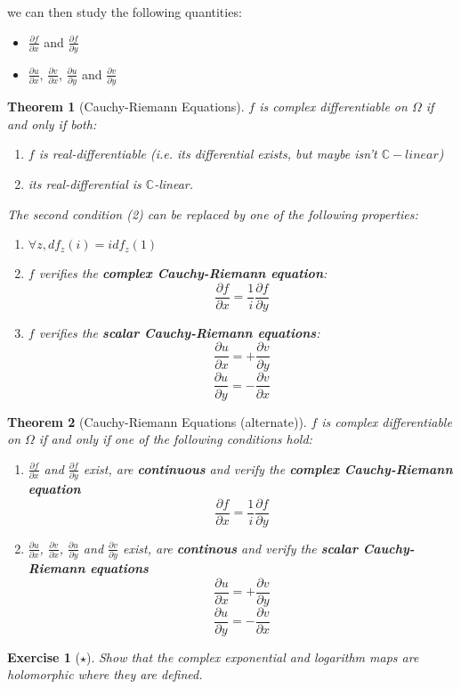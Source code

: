 \documentclass{article}
\newtheorem{exo}{Exercise}
\newtheorem*{thm*}{Theorem}
\begin{document}
we can then study the following quantities:
\begin{itemize}
    \item $\frac{\partial f}{\partial x}$ and $\frac{\partial f}{\partial y}$
\item $\frac{\partial u}{\partial x}$, $\frac{\partial v}{\partial x}$, $\frac{\partial u}{\partial y}$ and $\frac{\partial v}{\partial y}$
\end{itemize}


\begin{thm*}[Cauchy-Riemann Equations]
$f$ is complex differentiable on $\Omega$ if and only if both:
\begin{enumerate}
    \item $f$ is real-differentiable (i.e. its differential exists, but maybe isn't $\mathbb{C}-linear$)
    \item its real-differential is $\mathbb{C}$-linear.
\end{enumerate}

The second condition (2) can be replaced by one of the following properties:

\begin{enumerate}
    \item[(a)] $ \forall z, df_z(i) = idf_z(1)$
    \item[(b)] $f$ verifies the \textbf{complex Cauchy-Riemann equation}:
        $$ \frac{\partial f}{\partial x} = \frac{1}{i}\frac{\partial f}{\partial y}$$
    \item[(b)] $f$ verifies the \textbf{scalar Cauchy-Riemann equations}:
        $$ \frac{\partial u}{\partial x} = +\frac{\partial v}{\partial y}$$
        $$ \frac{\partial u}{\partial y} = -\frac{\partial v}{\partial x}$$
\end{enumerate}
\end{thm*}

\begin{thm*}[Cauchy-Riemann Equations (alternate)]
$f$ is complex differentiable on $\Omega$ if and only if one of the following conditions hold:

\begin{enumerate}
    \item[(a)] 
        $ \frac{\partial f}{\partial x}$ and $ \frac{\partial f}{\partial y}$ exist, are \textbf{continuous} and verify the \textbf{complex Cauchy-Riemann equation}
        $$ \frac{\partial f}{\partial x} = \frac{1}{i}\frac{\partial f}{\partial y}$$
    \item[(b)] $\frac{\partial u}{\partial x}$, $\frac{\partial v}{\partial x}$, $\frac{\partial u}{\partial y}$ and $\frac{\partial v}{\partial y}$ exist, are \textbf{continous} and verify the \textbf{scalar Cauchy-Riemann equations}
        $$ \frac{\partial u}{\partial x} = +\frac{\partial v}{\partial y}$$
        $$ \frac{\partial u}{\partial y} = -\frac{\partial v}{\partial x}$$
\end{enumerate}
\end{thm*}
\begin{exo}[$\star$]
    Show that the complex exponential and logarithm maps are holomorphic where they are defined.    
\end{exo}
\end{document}
